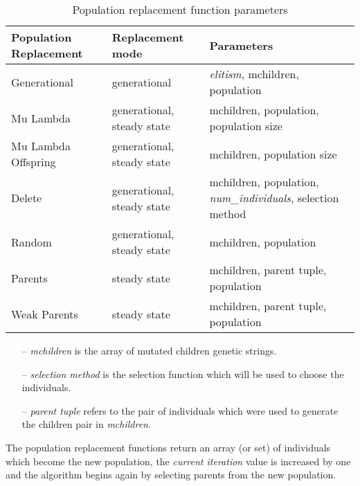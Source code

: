\begin{table}[H]
\begin{adjustwidth}{-5em}{-5em}
\centering
\footnotesize
\begin{tabular}{|l|l|l|} 
\hline
\rowcolor{Gray}
\textbf{Population Replacement} & \textbf{Replacement mode}  & \textbf{Parameters}                                      \\ 
\hline
Generational                    & generational               & \textit{elitism}, mchildren, population                            \\ 
\hline
Mu Lambda                       & generational, steady state & mchildren, population, population size                    \\ 
\hline
Mu Lambda Offspring             & generational, steady state & mchildren, population size                                \\ 
\hline
Delete                          & generational, steady state & mchildren, population, \textit{num\_individuals}, selection method  \\ 
\hline
Random                          & generational, steady state & mchildren, population                                     \\ 
\hline
Parents                         & steady state               & mchildren, parent tuple, population                   \\ 
\hline
Weak Parents                    & steady state               & mchildren, parent tuple, population                   \\
\hline
\end{tabular}
\end{adjustwidth}
\caption{ Population replacement function parameters}
\end{table}
\begin{itemize}
\item[--]\textit{mchildren} is the array of mutated children genetic strings.
\item[--]\textit{selection method} is the selection function which will be used to choose the individuals.
\item[--]\textit{parent tuple} refers to the pair of individuals which were used to generate the children pair in \textit{mchildren}.
\end{itemize}

The population replacement functions return an array (or set) of individuals which become the new population, the \textit{current iteration} value is increased by one and the algorithm begins again by selecting parents from the new population.

